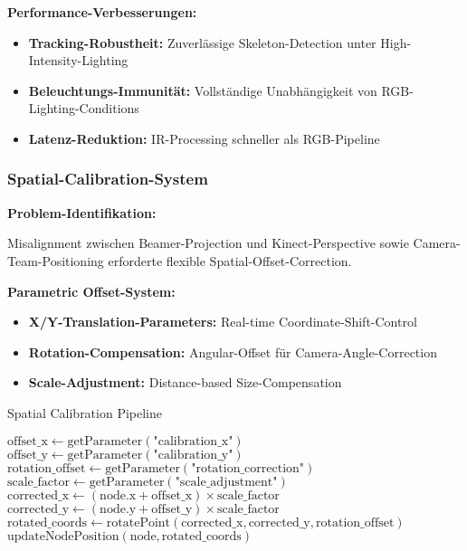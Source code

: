 \textbf{Performance-Verbesserungen:}
\begin{itemize}
    \item \textbf{Tracking-Robustheit:} Zuverlässige Skeleton-Detection unter High-Intensity-Lighting
    \item \textbf{Beleuchtungs-Immunität:} Vollständige Unabhängigkeit von RGB-Lighting-Conditions
    \item \textbf{Latenz-Reduktion:} IR-Processing schneller als RGB-Pipeline
\end{itemize}

\subsubsection{Spatial-Calibration-System}

\textbf{Problem-Identifikation:}
\raggedright Misalignment zwischen Beamer-Projection und Kinect-Perspective sowie Camera-Team-Positioning erforderte flexible Spatial-Offset-Correction.

\textbf{Parametric Offset-System:}
\begin{itemize}
    \item \textbf{X/Y-Translation-Parameters:} Real-time Coordinate-Shift-Control
    \item \textbf{Rotation-Compensation:} Angular-Offset für Camera-Angle-Correction
    \item \textbf{Scale-Adjustment:} Distance-based Size-Compensation
\end{itemize}

\begin{algorithm}[H]
\caption{Spatial Calibration Pipeline}\label{alg:spatial_calibration}
\begin{algorithmic}[1]
    \State $\text{offset\_x} \leftarrow \text{getParameter}(\text{"calibration\_x"})$
    \State $\text{offset\_y} \leftarrow \text{getParameter}(\text{"calibration\_y"})$
    \State $\text{rotation\_offset} \leftarrow \text{getParameter}(\text{"rotation\_correction"})$
    \State $\text{scale\_factor} \leftarrow \text{getParameter}(\text{"scale\_adjustment"})$
        \State $\text{corrected\_x} \leftarrow (\text{node.x} + \text{offset\_x}) \times \text{scale\_factor}$
        \State $\text{corrected\_y} \leftarrow (\text{node.y} + \text{offset\_y}) \times \text{scale\_factor}$
        \State $\text{rotated\_coords} \leftarrow \text{rotatePoint}(\text{corrected\_x}, \text{corrected\_y}, \text{rotation\_offset})$
        \State $\text{updateNodePosition}(\text{node}, \text{rotated\_coords})$
    \EndFor
\end{algorithmic}
\end{algorithm}

